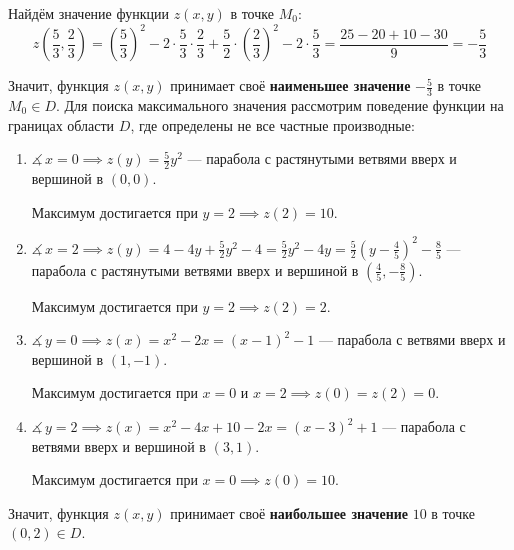 \begin{solution}
  Найдём значение функции \( z(x,y) \) в точке \( M_0 \):
  \[ z\left(\dfrac{5}{3},\dfrac{2}{3}\right)=\left(\dfrac{5}{3}\right)^2-2\cdot\dfrac{5}{3}\cdot\dfrac{2}{3}+\dfrac{5}{2}\cdot\left(\dfrac{2}{3}\right)^2-2\cdot\dfrac{5}{3}=\dfrac{25-20+10-30}{9}=-\dfrac{5}{3} \]
  
  Значит, функция \( z(x,y) \) принимает своё \textbf{наименьшее значение} \( -\frac{5}{3} \) в точке \( M_0\in D \). Для поиска максимального значения рассмотрим поведение функции на границах области \( D \), где определены не все частные производные:
  \begin{enumerate}
    \item \( \measuredangle\, x=0\implies z(y)=\frac{5}{2}y^2 \) --- парабола с растянутыми ветвями вверх и вершиной в \( (0,0) \).
    
    Максимум достигается при \( y=2\implies z(2)=10 \).
    \item \( \measuredangle\, x=2\implies z(y)=4-4y+\frac{5}{2}y^2-4=\frac{5}{2}y^2-4y=\frac{5}{2}\left(y-\frac{4}{5}\right)^2-\frac{8}{5} \) --- парабола с растянутыми ветвями вверх и вершиной в \( (\frac{4}{5},-\frac{8}{5}) \).
    
    Максимум достигается при \( y=2\implies z(2)=2 \).
    \item \( \measuredangle\, y=0\implies z(x)=x^2-2x=(x-1)^2-1 \) --- парабола с ветвями вверх и вершиной в \( (1,-1) \).
    
    Максимум достигается при \( x=0 \) и \( x=2\implies z(0)=z(2)=0 \).
    \item \( \measuredangle\, y=2\implies z(x)=x^2-4x+10-2x=(x-3)^2+1 \) --- парабола с ветвями вверх и вершиной в \( (3,1) \).
    
    Максимум достигается при \( x=0\implies z(0)=10 \).
  \end{enumerate}
  
  Значит, функция \( z(x,y) \) принимает своё \textbf{наибольшее значение} \( 10 \) в точке \( (0,2)\in D \).
\end{solution}